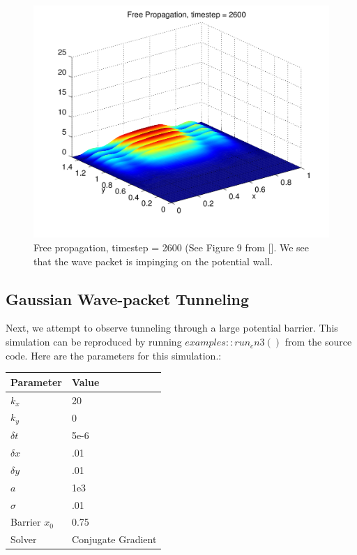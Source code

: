 \documentclass[letterpaper,12pt]{article}
\begin{document}
\begin{figure}[!htbp]
\centering
\includegraphics[scale=0.55,trim = 2mm 20mm 12mm 15mm,clip=true]{prop4.png}
\caption{Free propagation, timestep = 2600 (See Figure 9 from []. We see that the wave packet is impinging on the potential wall.}
\label{fig:p3}
\end{figure}

\subsection{Gaussian Wave-packet Tunneling}

Next, we attempt to observe tunneling through a large potential barrier.  This simulation can be reproduced by running $examples::run_cn3()$ from the source code. Here are the parameters for this simulation.:

\begin{center}
    \begin{tabular}{ | l | l  |}
    \hline
    Parameter & Value  \\ \hline
	$k_x$ & 20  \\ \hline
	$k_y$ & 0  \\ \hline    
	$\delta t$ & 5e-6  \\ \hline    
    $\delta x$ & .01  \\ \hline    
    $\delta y$ & .01  \\ \hline 
 	$a$ & 1e3  \\ \hline    
    $\sigma$ & .01  \\ \hline  
    Barrier $x_0$ & 0.75 \\ \hline            
    Solver & Conjugate Gradient  \\ \hline            
    \hline
    \end{tabular}
\end{center}
\end{document}
